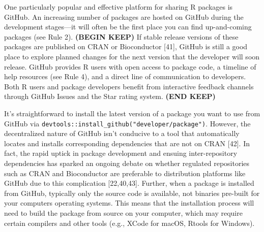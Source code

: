 \documentclass[10pt,letterpaper]{article}
\begin{document}
One particularly popular and effective platform for sharing R packages
is GitHub. An increasing number of packages are hosted on GitHub during
the development stages---it will often be the first place you can find
up-and-coming packages (see Rule 2). \textbf{(BEGIN KEEP)} If stable
release versions of these packages are published on CRAN or Bioconductor
{[}41{]}, GitHub is still a good place to explore planned changes for
the next version that the developer will soon release. GitHub provides R
users with open access to package code, a timeline of help resources
(see Rule 4), and a direct line of communication to developers. Both R
users and package developers benefit from interactive feedback channels
through GitHub Issues and the Star rating system. \textbf{(END KEEP)}

It's straightforward to install the latest version of a package you want
to use from GitHub via
\texttt{devtools::install\_github("developer/package")}. However, the
decentralized nature of GitHub isn't conducive to a tool that
automatically locates and installs corresponding dependencies that are
not on CRAN {[}42{]}. In fact, the rapid uptick in package development
and ensuing inter-repository dependencies has sparked an ongoing debate
on whether regulated repositories such as CRAN and Bioconductor are
preferable to distribution platforms like GitHub due to this
complication {[}22,40,43{]}. Further, when a package is installed from
GitHub, typically only the source code is available, not binaries
pre-built for your computers operating systems. This means that the
installation process will need to build the package from source on your
computer, which may require certain compilers and other tools (e.g.,
XCode for macOS, Rtools for Windows).
\end{document}
